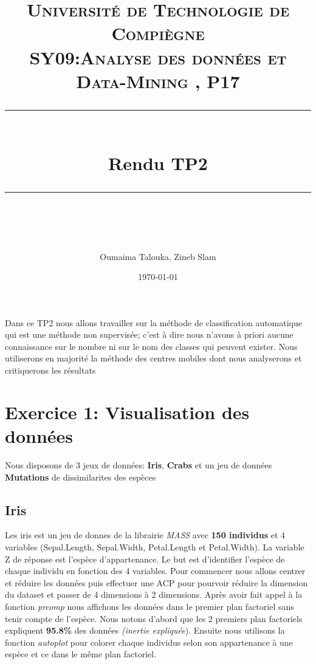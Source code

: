 \documentclass[10pt]{article}
\title{
	\normalfont \normalsize 
	\textsc{Université de Technologie de Compiègne\\ 
		SY09:Analyse des données et Data-Mining , P17} \\
	[10pt] 
	\rule{\linewidth}{0.5pt} \\[6pt] 
	\huge Rendu TP2\\
	\rule{\linewidth}{2pt}  \\[10pt]
}
\author{Oumaima Talouka, Zineb Slam}
\date{\normalsize \today}
\begin{document}
	{\let\newpage\relax\maketitle}	
	
		Dans ce TP2 nous allons travailler sur la méthode de classification automatique qui est une  méthode non supervisée; c'est à dire nous  n'avons à priori aucune connaissance  sur le nombre ni sur le nom des classes qui peuvent exister. Nous utiliserons en majorité la méthode des centres mobiles dont nous analyserons et critiquerons les résultats
	
	\section{ Exercice 1: Visualisation des données}
	Nous disposons de 3 jeux de données:  \textbf{Iris}, \textbf{Crabs} et un jeu de données \textbf{Mutations} de dissimilarites des espèces
	
	\subsection{Iris}
		Les iris est un jeu de donnes de la librairie \textit{MASS} avec \textbf{150 individus} et 4 variables (Sepal.Length, Sepal.Width, Petal.Length et Petal.Width).  La variable Z de réponse est l'espèce d'appartenance. Le but est d'identifier l'espèce de chaque individu en fonction des 4 variables. Pour commencer nous allons centrer et réduire les données puis effectuer une ACP pour pourvoir réduire la dimension du dataset et passer de 4 dimensions à 2 dimensions. Après avoir fait appel à la fonction \textit{prcomp} nous affichons les données dans le premier plan factoriel sans tenir compte de l'espèce. Nous notons d'abord que les 2 premiers plan factoriels expliquent \textbf{95.8\%} des données \textit{(inertie expliquée}).  Ensuite  nous utilisons la fonction \textit{autoplot} pour colorer chaque individus selon son appartenance à une espèce et ce dans le même plan factoriel.
		
\end{document}
